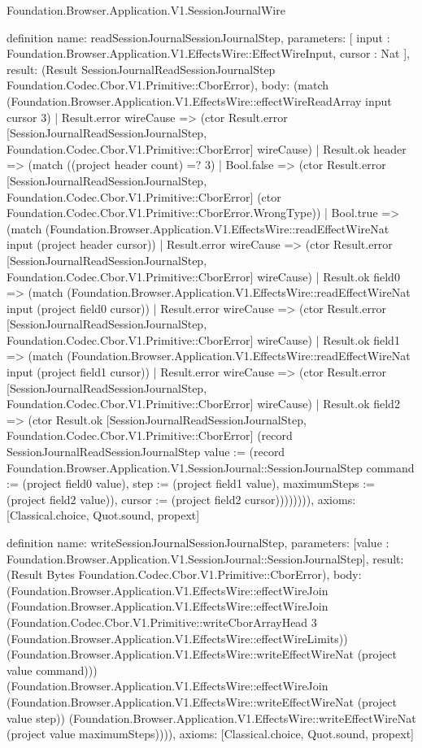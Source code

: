 \begin{lexlean}{Foundation.Browser.Application.V1.SessionJournalWire}
\begin{semanticmodule}
definition{
  name: readSessionJournalSessionJournalStep,
  parameters: [
    input : Foundation.Browser.Application.V1.EffectsWire::EffectWireInput,
    cursor : Nat
  ],
  result: (Result SessionJournalReadSessionJournalStep Foundation.Codec.Cbor.V1.Primitive::CborError),
  body: (match (Foundation.Browser.Application.V1.EffectsWire::effectWireReadArray input cursor 3)
    | Result.error wireCause => (ctor Result.error [SessionJournalReadSessionJournalStep, Foundation.Codec.Cbor.V1.Primitive::CborError] wireCause)
    | Result.ok header => (match ((project header count) =? 3)
      | Bool.false => (ctor Result.error [SessionJournalReadSessionJournalStep, Foundation.Codec.Cbor.V1.Primitive::CborError] (ctor Foundation.Codec.Cbor.V1.Primitive::CborError.WrongType))
      | Bool.true => (match (Foundation.Browser.Application.V1.EffectsWire::readEffectWireNat input (project header cursor))
        | Result.error wireCause => (ctor Result.error [SessionJournalReadSessionJournalStep, Foundation.Codec.Cbor.V1.Primitive::CborError] wireCause)
        | Result.ok field0 => (match (Foundation.Browser.Application.V1.EffectsWire::readEffectWireNat input (project field0 cursor))
          | Result.error wireCause => (ctor Result.error [SessionJournalReadSessionJournalStep, Foundation.Codec.Cbor.V1.Primitive::CborError] wireCause)
          | Result.ok field1 => (match (Foundation.Browser.Application.V1.EffectsWire::readEffectWireNat input (project field1 cursor))
            | Result.error wireCause => (ctor Result.error [SessionJournalReadSessionJournalStep, Foundation.Codec.Cbor.V1.Primitive::CborError] wireCause)
            | Result.ok field2 => (ctor Result.ok [SessionJournalReadSessionJournalStep, Foundation.Codec.Cbor.V1.Primitive::CborError] (record SessionJournalReadSessionJournalStep {value := (record Foundation.Browser.Application.V1.SessionJournal::SessionJournalStep {command := (project field0 value), step := (project field1 value), maximumSteps := (project field2 value)}), cursor := (project field2 cursor)}))))))),
  axioms: [Classical.choice, Quot.sound, propext]
}

definition{
  name: writeSessionJournalSessionJournalStep,
  parameters: [value : Foundation.Browser.Application.V1.SessionJournal::SessionJournalStep],
  result: (Result Bytes Foundation.Codec.Cbor.V1.Primitive::CborError),
  body: (Foundation.Browser.Application.V1.EffectsWire::effectWireJoin (Foundation.Browser.Application.V1.EffectsWire::effectWireJoin (Foundation.Codec.Cbor.V1.Primitive::writeCborArrayHead 3 (Foundation.Browser.Application.V1.EffectsWire::effectWireLimits)) (Foundation.Browser.Application.V1.EffectsWire::writeEffectWireNat (project value command))) (Foundation.Browser.Application.V1.EffectsWire::effectWireJoin (Foundation.Browser.Application.V1.EffectsWire::writeEffectWireNat (project value step)) (Foundation.Browser.Application.V1.EffectsWire::writeEffectWireNat (project value maximumSteps)))),
  axioms: [Classical.choice, Quot.sound, propext]
}


\end{semanticmodule}
\end{lexlean}
